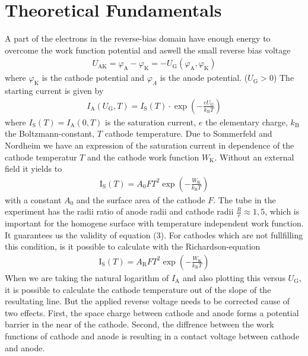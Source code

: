 \documentclass[a4paper, 12pt]{scrartcl}
\begin{document}
\section{Theoretical Fundamentals} 
A part of the electrons in the reverse-bias domain have enough energy to overcome the work function potential and aswell the small reverse bias voltage 
\begin{align}
U_{\textrm{AK}} = \varphi_\textrm{A} - \varphi_\textrm{K} = -U_\textrm{G}(\varphi_\textrm{A}, \varphi_\textrm{K}) 
\end{align}
where $\varphi_\textrm{K}$ is the cathode potential and $\varphi_{A}$ is the anode potential. ($U_\textrm{G} > 0$) The starting current is given by 
\begin{align}
I_\textrm{A}(U_\textrm{G},T) = I_\textrm{S}(T) \cdot  \exp \left( - \frac{eU_\textrm{G}}{k_\textrm{B}T} \right) 
\end{align}
where $I_\textrm{S}(T)=I_\textrm{A}(0,T)$ is the saturation current, $e$ the elementary charge, $k_\textrm{B}$ the Boltzmann-constant, $T$ cathode temperature. Due to Sommerfeld and Nordheim we have an expression of the saturation current in dependence of the cathode temperatur $T$ and the cathode work function $W_\textrm{K}$. Without an external field it yields to
\begin{align}
\textrm{I}_\textrm{S} (T) = A_0 FT^2 \exp \left( - \frac{W_\textrm{K}}{k_\textrm{B} T} \right)
\end{align}
with a constant $A_0$ and the surface area of the cathode $F$. The tube in the experiment has the radii ratio of anode radii and cathode radii  $\frac{R}{r} \approx 1,5$, which is important for the homogene surface with temperature independent work function. It guarantees us the validity of equation (3). For cathodes which are not fullfilling this condition, is it possible to calculate with the Richardson-equation 
\begin{align}
\textrm{I}_\textrm{S} (T) = A_\textrm{R} FT^2 \exp \left( - \frac{W_\textrm{K}}{k_\textrm{B} T} \right)
\end{align}
\newline 
\newline 
When we are taking the natural logarithm of $I_\textrm{A}$ and also plotting this versus $U_\textrm{G}$, it is possible to calculate the cathode temperature out of the slope of the resultating line. But the applied reverse voltage needs to be corrected cause of two effects. First, the space charge between cathode and anode forms a potential barrier in the near of the cathode. Second, the diffrence between the work functions of cathode and anode is resulting in a contact voltage between cathode and anode. 
\end{document}
